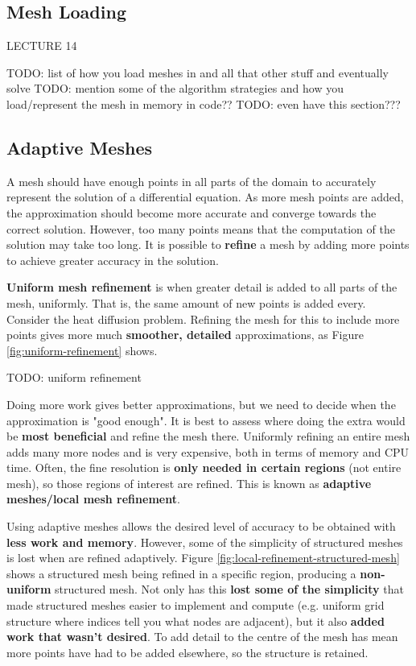 \documentclass{article}
\begin{document}
\subsection{Mesh Loading}
\label{sec:mesh-loading}

LECTURE 14

TODO: list of how you load meshes in and all that other stuff and eventually solve
TODO: mention some of the algorithm strategies and how you load/represent the mesh in memory in code??
TODO: even have this section???

\subsection{Adaptive Meshes}
\label{sec:adaptive-meshes}

A mesh should have enough points in all parts of the domain to accurately represent the solution of a differential equation. As more mesh points are added, the approximation should become more accurate and converge towards the correct solution. However, too many points means that the computation of the solution may take too long. It is possible to \textbf{refine} a mesh by adding more points to achieve greater accuracy in the solution.

\textbf{Uniform mesh refinement} is when greater detail is added to all parts of the mesh, uniformly. That is, the same amount of new points is added every. Consider the heat diffusion problem. Refining the mesh for this to include more points gives more much \textbf{smoother, detailed} approximations, as Figure \ref{fig:uniform-refinement} shows.

TODO: uniform refinement

Doing more work gives better approximations, but we need to decide when the approximation is "good enough". It is best to assess where doing the extra would be \textbf{most beneficial} and refine the mesh there. Uniformly refining an entire mesh adds many more nodes and is very expensive, both in terms of memory and CPU time. Often, the fine resolution is \textbf{only needed in certain regions} (not entire mesh), so those regions of interest are refined. This is known as \textbf{adaptive meshes/local mesh refinement}.
 
Using adaptive meshes allows the desired level of accuracy to be obtained with \textbf{less work and memory}. However, some of the simplicity of structured meshes is lost when are refined adaptively. Figure \ref{fig:local-refinement-structured-mesh} shows a structured mesh being refined in a specific region, producing a \textbf{non-uniform} structured mesh. Not only has this \textbf{lost some of the simplicity} that made structured meshes easier to implement and compute (e.g. uniform grid structure where indices tell you what nodes are adjacent), but it also \textbf{added work that wasn't desired}. To add detail to the centre of the mesh has mean more points have had to be added elsewhere, so the structure is retained.
\end{document}
